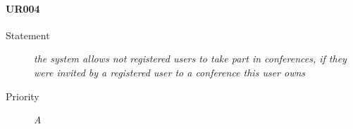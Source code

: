 \paragraph{UR004}
\begin{description}
  \item [Statement] 
    \textit{ the system allows not registered users to take part in conferences, if they were invited by a registered user to a conference this user owns}
  \item [Priority] \textit{A}
\end{description}


